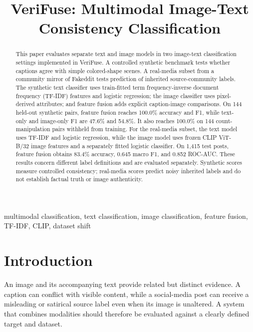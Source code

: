 \documentclass[conference]{IEEEtran}
\begin{document}
\title{VeriFuse: Multimodal Image-Text Consistency Classification}
\author{}
\maketitle
\begin{abstract}
This paper evaluates separate text and image models in two image-text classification settings implemented in VeriFuse. A controlled synthetic benchmark tests whether captions agree with simple colored-shape scenes. A real-media subset from a community mirror of Fakeddit tests prediction of inherited source-community labels. The synthetic text classifier uses train-fitted term frequency-inverse document frequency (TF-IDF) features and logistic regression; the image classifier uses pixel-derived attributes; and feature fusion adds explicit caption-image comparisons. On 144 held-out synthetic pairs, feature fusion reaches 100.0\% accuracy and F1, while text-only and image-only F1 are 47.6\% and 54.8\%. It also reaches 100.0\% on 144 count-manipulation pairs withheld from training. For the real-media subset, the text model uses TF-IDF and logistic regression, while the image model uses frozen CLIP ViT-B/32 image features and a separately fitted logistic classifier. On 1,415 test posts, feature fusion obtains 83.4\% accuracy, 0.645 macro F1, and 0.852 ROC-AUC. These results concern different label definitions and are evaluated separately. Synthetic scores measure controlled consistency; real-media scores predict noisy inherited labels and do not establish factual truth or image authenticity.
\end{abstract}
\begin{IEEEkeywords}
multimodal classification, text classification, image classification, feature fusion, TF-IDF, CLIP, dataset shift
\end{IEEEkeywords}
\section{Introduction}
An image and its accompanying text provide related but distinct evidence. A caption can conflict with visible content, while a social-media post can receive a misleading or satirical source label even when its image is unaltered. A system that combines modalities should therefore be evaluated against a clearly defined target and dataset.
\end{document}
